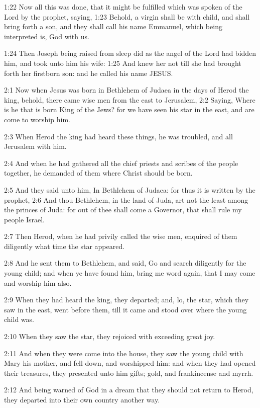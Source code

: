 1:22 Now all this was done, that it might be fulfilled which was spoken of the Lord by the prophet, saying, 1:23 Behold, a virgin shall be with child, and shall bring forth a son, and they shall call his name Emmanuel, which being interpreted is, God with us.

1:24 Then Joseph being raised from sleep did as the angel of the Lord had bidden him, and took unto him his wife: 1:25 And knew her not till she had brought forth her firstborn son: and he called his name JESUS.

2:1 Now when Jesus was born in Bethlehem of Judaea in the days of Herod the king, behold, there came wise men from the east to Jerusalem, 2:2 Saying, Where is he that is born King of the Jews? for we have seen his star in the east, and are come to worship him.

2:3 When Herod the king had heard these things, he was troubled, and all Jerusalem with him.

2:4 And when he had gathered all the chief priests and scribes of the people together, he demanded of them where Christ should be born.

2:5 And they said unto him, In Bethlehem of Judaea: for thus it is written by the prophet, 2:6 And thou Bethlehem, in the land of Juda, art not the least among the princes of Juda: for out of thee shall come a Governor, that shall rule my people Israel.

2:7 Then Herod, when he had privily called the wise men, enquired of them diligently what time the star appeared.

2:8 And he sent them to Bethlehem, and said, Go and search diligently for the young child; and when ye have found him, bring me word again, that I may come and worship him also.

2:9 When they had heard the king, they departed; and, lo, the star, which they saw in the east, went before them, till it came and stood over where the young child was.

2:10 When they saw the star, they rejoiced with exceeding great joy.

2:11 And when they were come into the house, they saw the young child with Mary his mother, and fell down, and worshipped him: and when they had opened their treasures, they presented unto him gifts; gold, and frankincense and myrrh.

2:12 And being warned of God in a dream that they should not return to Herod, they departed into their own country another way.

